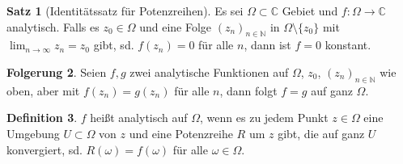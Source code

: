 \documentclass[11pt,titlepage]{article}
\theoremstyle{definition}
\newtheorem{theorem}{Satz}[section]
\newtheorem{corollary}[theorem]{Folgerung}
\newtheorem{definition}[theorem]{Definition}
\theoremstyle{remark}
\begin{document}
	\begin{theorem}[Identitätssatz für Potenzreihen]
		Es sei $\Omega \subset \mathbb{C}$ Gebiet und $f:\Omega\to \mathbb{C}$ analytisch. 
		Falls es $z_0 \in \Omega$ und eine Folge $(z_n)_{n\in \mathbb{N}}$ in $\Omega\setminus\{
		z_0\}$ mit $\lim_{n\to \infty} z_n = z_0$ gibt, sd. $f(z_n)=0$ für alle $n$, dann ist $f=0$ konstant.
	\end{theorem}
	
	\begin{corollary}
		Seien $f,g$ zwei analytische Funktionen auf $\Omega$, $z_0$, $(z_n)_{n\in\mathbb{N}}$ wie 
		oben, aber mit $f(z_n)=g(z_n)$ für alle $n$, dann folgt $f=g$ auf ganz $\Omega$.
	\end{corollary}
	
	\begin{definition}
		$f$ heißt analytisch auf $\Omega$, wenn es zu jedem Punkt $z\in \Omega$ eine Umgebung 
		$U\subset\Omega$ von $z$ und eine Potenzreihe $R$ um $z$ gibt, die auf ganz $U$ 
		konvergiert, sd. $R(\omega)=f(\omega)$ für alle $\omega\in\Omega$.
	\end{definition}
	
\end{document}

